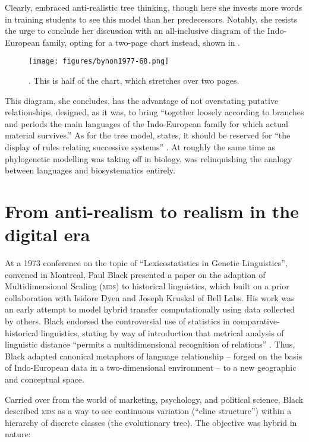 \documentclass[output=paper]{langscibook}
\begin{document}
Clearly, {\Bynon} embraced anti-realistic tree thinking, though here she invests more words in training students to see this model than her  predecessors. Notably, she resists the urge to conclude her discussion with an all-inclusive diagram of the Indo-European family, opting for a two-page chart instead, shown in .

\begin{figure}
    \centering
    \texttt{[image: figures/bynon1977-68.png]}
    \caption{\citet[68]{Bynon1977}. This is half of the chart, which stretches over two pages.}
    \label{fig:kaplan:bynon197768}
\end{figure}

This diagram, she concludes, has the advantage of not overstating putative relationships, designed, as it was, to bring ``together loosely according to branches and periods the main languages of the Indo-European family for which actual material survives.'' As for the tree model, {\Bynon} states, it should be reserved for ``the display of rules relating successive systems'' \citep[70]{Bynon1977}. At roughly the same time as phylogenetic modelling was taking off in biology, {\Bynon} was relinquishing the analogy between languages and biosystematics entirely.

\section{From anti-realism to realism in the digital era}
\label{sec:kaplan:realism}

At a 1973 conference on the topic of ``Lexicostatistics in Genetic Linguistics'', convened in Montreal, Paul Black presented a paper on the adaption of Multidimensional Scaling (\textsc{mds}) to historical linguistics, which built on a prior collaboration with Isidore Dyen and Joseph Kruskal of Bell Labs. His work was an early attempt to model hybrid transfer computationally using data collected by others. Black endorsed the controversial use of statistics in comparative-historical linguistics, stating by way of introduction that metrical analysis of linguistic distance ``permits a multidimensional recognition of relations'' \citep[43--92]{Black1973}. Thus, Black adapted canonical metaphors of language relationship -- forged on the basis of Indo-European data in a two-dimensional environment -- to a new geographic and conceptual space.

Carried over from the world of marketing, psychology, and political science, Black described \textsc{mds} as a way to see continuous variation (``cline structure'') within a hierarchy of discrete classes (the evolutionary tree).  The objective was hybrid in nature:
\end{document}
